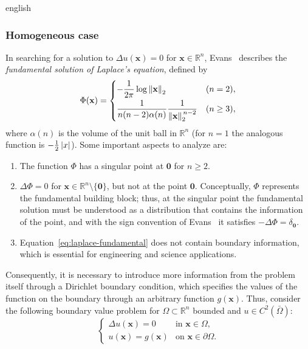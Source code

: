 \documentclass[0000.tex]{subfiles}
\begin{document}
\begin{hyphenrules}{english}
\subsubsection{Homogeneous case}
In searching for a solution to $\Delta u(\mathbf{x})=0$ for $\mathbf{x}\in\mathbb{R}^n$, Evans~\cite{evans2010} describes the
\emph{fundamental solution of Laplace's equation}, defined by
\begin{equation}
  \Phi(\mathbf{x})=
  \begin{cases}
    -\dfrac{1}{2\pi}\log\left\lVert \mathbf{x} \right\rVert_2 & (n=2),\\[2mm]
    \dfrac{1}{n(n-2)\alpha(n)}\dfrac{1}{\left\lVert \mathbf{x} \right\rVert_2^{\,n-2}} & (n\ge3),
  \end{cases}
  \label{eq:laplace-fundamental}
\end{equation}
where $\alpha(n)$ is the volume of the unit ball in $\mathbb{R}^n$ (for $n=1$ the analogous function is
$-\tfrac12\left\lvert x \right\rvert$). Some important aspects to analyze are:
\begin{enumerate}
  \item The function $\Phi$ has a singular point at $\mathbf{0}$ for $n\ge2$.
  \item $\Delta\Phi=0$ for $\mathbf{x}\in\mathbb{R}^n\setminus\{\mathbf{0}\}$, but not at the point $\mathbf{0}$.
    Conceptually, $\Phi$ represents the fundamental building block; thus, at the singular point the
    fundamental solution must be understood as a distribution that contains the information of the
    point, and with the sign convention of Evans~\cite{evans2010} it satisfies $-\Delta\Phi=\delta_{\mathbf{0}}$.
  \item Equation~\eqref{eq:laplace-fundamental} does not contain boundary information, which is essential for
    engineering and science applications.
\end{enumerate}

Consequently, it is necessary to introduce more information from the problem itself through a
Dirichlet boundary condition, which specifies the values of the function on the boundary through an
arbitrary function $g(\mathbf{x})$. Thus, consider the following boundary value problem for
$\Omega\subset\mathbb{R}^n$ bounded and $u\in C^2(\bar\Omega)$:
\begin{equation}
  \begin{cases}
    \Delta u(\mathbf{x})=0 & \text{in } \mathbf{x}\in\Omega,\\
    u(\mathbf{x})=g(\mathbf{x}) & \text{on } \mathbf{x}\in\partial\Omega.
  \end{cases}
  \label{eq:laplace-dirichlet}
\end{equation}


\end{hyphenrules}
\end{document}
